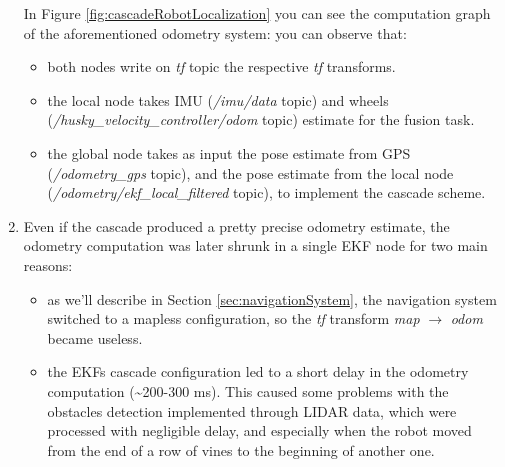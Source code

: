 \begin{enumerate}
In Figure \ref{fig:cascadeRobotLocalization} you can see the computation graph of the aforementioned odometry system: you can observe that:
	\begin{itemize}
		\item both nodes write on \textit{tf} topic the respective \textit{tf} transforms.
		\item the local node takes \ac{IMU} (\textit{/imu/data} topic) and wheels \\ (\textit{/husky\_velocity\_controller/odom} topic) estimate for the fusion task.
		\item the global node takes as input the pose estimate from GPS (\textit{/odometry\_gps} topic), and the pose estimate from the local node (\textit{/odometry/ekf\_local\_filtered} topic), to implement the cascade scheme.
	\end{itemize}

	\item Even if the cascade produced a pretty precise odometry estimate, the odometry computation was later shrunk in a single \ac{EKF} node for two main reasons:
	\begin{itemize}
		\item as we'll describe in Section \ref{sec:navigationSystem}, the navigation system switched to a mapless configuration, so the \textit{tf} transform  \textit{map} $\rightarrow$ \textit{odom} became useless.
		\item the \ac{EKF}s cascade configuration led to a short delay in the odometry computation (\textasciitilde200-300 ms). This caused some problems with the obstacles detection implemented through \ac{LIDAR} data, which were processed with negligible delay, and especially when the robot moved from the end of a row of vines to the beginning of another one. 
	\end{itemize}
\end{enumerate}

